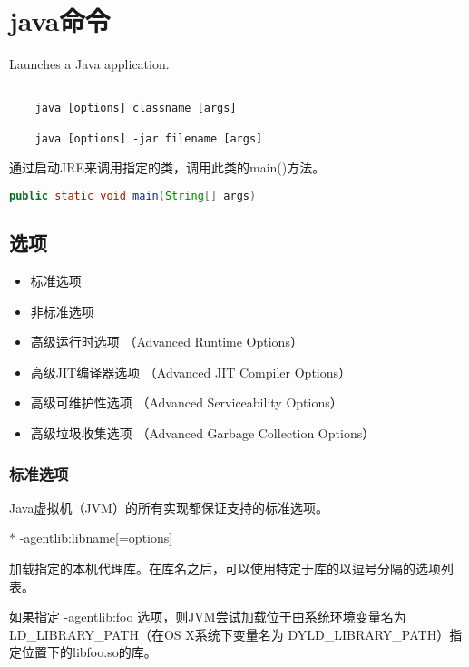 \section{java命令}
\label{chap:tools_java}

Launches a Java application.

\begin{lstlisting}[language=cshell]

    java [options] classname [args]

    java [options] -jar filename [args]

\end{lstlisting}

通过启动JRE来调用指定的类，调用此类的main()方法。
\begin{lstlisting}[language=Java]
    public static void main(String[] args)
\end{lstlisting}

\subsection{选项} 


\begin{itemize}
    \item   标准选项
    \item   非标准选项 
    \item   高级运行时选项      （Advanced Runtime Options）
    \item   高级JIT编译器选项   （Advanced JIT Compiler Options）
    \item   高级可维护性选项    （Advanced Serviceability Options）
    \item   高级垃圾收集选项    （Advanced Garbage Collection Options）
\end{itemize}



\subsubsection{标准选项} 

Java虚拟机（JVM）的所有实现都保证支持的标准选项。


* -agentlib:libname[=options]

加载指定的本机代理库。在库名之后，可以使用特定于库的以逗号分隔的选项列表。

如果指定 -agentlib:foo 选项，则JVM尝试加载位于由系统环境变量名为LD\_LIBRARY\_PATH（在OS X系统下变量名为 DYLD\_LIBRARY\_PATH）指定位置下的libfoo.so的库。

